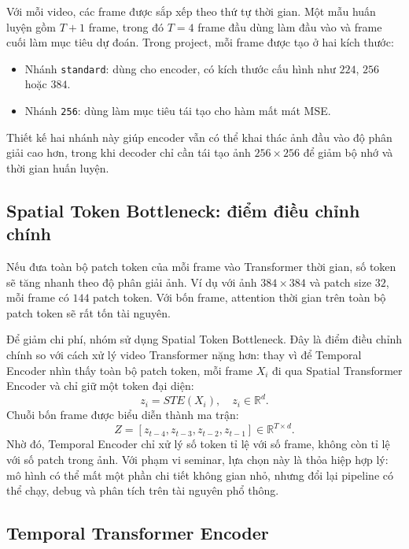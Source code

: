 Với mỗi video, các frame được sắp xếp theo thứ tự thời gian. Một mẫu huấn luyện gồm $T+1$ frame, trong đó $T=4$ frame đầu dùng làm đầu vào và frame cuối làm mục tiêu dự đoán. Trong project, mỗi frame được tạo ở hai kích thước:
\begin{itemize}
    \item Nhánh \texttt{standard}: dùng cho encoder, có kích thước cấu hình như $224$, $256$ hoặc $384$.
    \item Nhánh \texttt{256}: dùng làm mục tiêu tái tạo cho hàm mất mát MSE.
\end{itemize}

Thiết kế hai nhánh này giúp encoder vẫn có thể khai thác ảnh đầu vào độ phân giải cao hơn, trong khi decoder chỉ cần tái tạo ảnh $256 \times 256$ để giảm bộ nhớ và thời gian huấn luyện.

\subsection{Spatial Token Bottleneck: điểm điều chỉnh chính}

Nếu đưa toàn bộ patch token của mỗi frame vào Transformer thời gian, số token sẽ tăng nhanh theo độ phân giải ảnh. Ví dụ với ảnh $384 \times 384$ và patch size $32$, mỗi frame có $144$ patch token. Với bốn frame, attention thời gian trên toàn bộ patch token sẽ rất tốn tài nguyên.

Để giảm chi phí, nhóm sử dụng Spatial Token Bottleneck. Đây là điểm điều chỉnh chính so với cách xử lý video Transformer nặng hơn: thay vì để Temporal Encoder nhìn thấy toàn bộ patch token, mỗi frame $X_i$ đi qua Spatial Transformer Encoder và chỉ giữ một token đại diện:
\begin{equation}
z_i = STE(X_i), \quad z_i \in \mathbb{R}^{d}.
\end{equation}
Chuỗi bốn frame được biểu diễn thành ma trận:
\begin{equation}
Z = [z_{t-4}, z_{t-3}, z_{t-2}, z_{t-1}] \in \mathbb{R}^{T \times d}.
\end{equation}
Nhờ đó, Temporal Encoder chỉ xử lý số token tỉ lệ với số frame, không còn tỉ lệ với số patch trong ảnh. Với phạm vi seminar, lựa chọn này là thỏa hiệp hợp lý: mô hình có thể mất một phần chi tiết không gian nhỏ, nhưng đổi lại pipeline có thể chạy, debug và phân tích trên tài nguyên phổ thông.

\subsection{Temporal Transformer Encoder}

